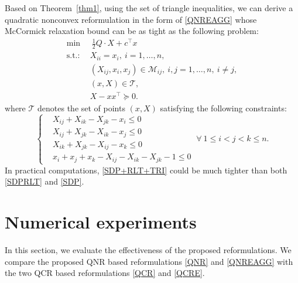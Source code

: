 \documentclass[pdflatex,sn-mathphys-num]{sn-jnl}%
\theoremstyle{thmstyleone}%
\theoremstyle{thmstyletwo}%
\theoremstyle{thmstylethree}%
\begin{document}
Based on Theorem~\ref{thm1}, using the set of triangle inequalities, we can derive a quadratic nonconvex reformulation in the form of \eqref{QNREAGG} whose McCormick relaxation bound can be as tight as the following problem:
\begin{equation}\label{SDP+RLT+TRI}\tag{SDP+RLT+TRI}
	\begin{aligned}
		\min ~&~ \frac{1}{2} Q\cdot X+c^\top x  \\
		\mbox{s.t.:} ~~&X_{ii}=x_{i},~i=1,\ldots,n,\\
		&(X_{ij},x_i,x_j)\in \mathcal{M}_{ij},~i,j=1,\ldots,n,~i\neq j,\\
		&(x,X)\in\mathcal{T},\\
		&X-xx^\top\succeq 0.
	\end{aligned}
\end{equation}
where $\mathcal{T}$ denotes the set of points $(x,X)$ satisfying the following constraints:
\begin{equation}\label{triangle2}
	\left\{
	\begin{aligned}
		&X_{ij} + X_{ik}-X_{jk}-x_i\leq 0\\
		&X_{ij} + X_{jk}-X_{ik}-x_j\leq 0\\
		&X_{ik} + X_{jk}-X_{ij}-x_k\leq 0\\
		&x_i+x_j+x_k-X_{ij} -X_{ik}-X_{jk}-1\leq 0
	\end{aligned}\right.~\forall ~1\leq i<j<k\leq n.
\end{equation}
In practical computations, \eqref{SDP+RLT+TRI} could be much tighter than both \eqref{SDPRLT} and \eqref{SDP}. %





\section{Numerical experiments}\label{sec4}

In this section, we evaluate the effectiveness of the proposed reformulations. We compare the proposed QNR based reformulations \eqref{QNR} and \eqref{QNREAGG} with the two QCR based reformulations \eqref{QCR} and \eqref{QCRE}.
\end{document}
